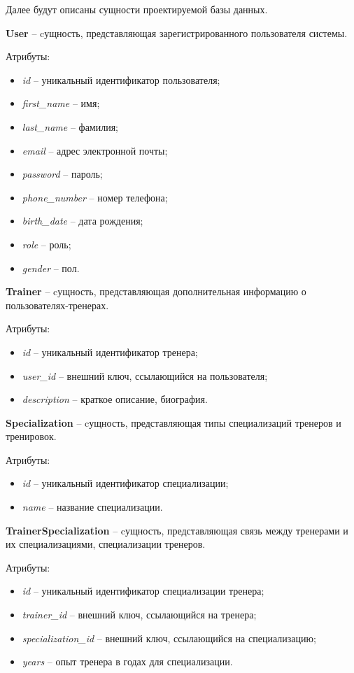 Далее будут описаны сущности проектируемой базы данных.

\textbf{User} -- cущность, представляющая зарегистрированного пользователя системы.

Атрибуты: 
\begin{itemize} 
	\item \textit{id} -- уникальный идентификатор пользователя; 
	\item \textit{first\_name} -- имя;
	\item \textit{last\_name} -- фамилия; 
	\item \textit{email} -- адрес электронной почты;
	\item \textit{password} -- пароль;
	\item \textit{phone\_number} -- номер телефона;
	\item \textit{birth\_date} -- дата рождения;
	\item \textit{role} -- роль;
	\item \textit{gender} -- пол. 
\end{itemize}

\textbf{Trainer} -- cущность, представляющая дополнительная информацию о пользователях-тренерах.

Атрибуты: 
\begin{itemize} 
	\item \textit{id} -- уникальный идентификатор тренера;
	\item \textit{user\_id} -- внешний ключ, ссылающийся на пользователя;
	\item \textit{description} -- краткое описание, биография. 
\end{itemize}

\textbf{Specialization} -- cущность, представляющая типы специализаций тренеров и тренировок.

Атрибуты:
\begin{itemize} 
	\item \textit{id} -- уникальный идентификатор специализации; 
	\item \textit{name} -- название специализации.
\end{itemize}

\textbf{TrainerSpecialization} -- cущность, представляющая связь между тренерами и их специализациями, специализации тренеров.

Атрибуты:
\begin{itemize} 
	\item \textit{id} -- уникальный идентификатор специализации тренера;
	\item \textit{trainer\_id} -- внешний ключ, ссылающийся на тренера;
	\item \textit{specialization\_id} -- внешний ключ, ссылающийся на специализацию;
	\item \textit{years} -- опыт тренера в годах для специализации.
\end{itemize}


